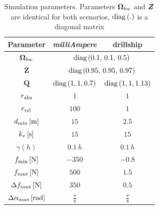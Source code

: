 \begin{table}[b]
    \centering
    \begin{tabular}{c|cc}
        {\bf Parameter} & {\bf \emph{milliAmpere}} & {\bf drillship} \\ \hline
        $\bm{\Omega}_{bw}$ & \multicolumn{2}{c}{$\operatorname*{diag}{(0.1,\,0.1,\,0.5)}$} \\
        $\mathbf{Z}$ & \multicolumn{2}{c}{$\operatorname*{diag}{(0.95,\,0.95,\,0.97)}$} \\
        $\mathbf{Q}$ & $\operatorname*{diag}{(1,1,0.7)}$ & $\operatorname*{diag}{(1,1,1.13)}$ \\
        $r_{\rm abs}$ & $1$ & $1$ \\
        $r_{\rm rel}$ & $100$ & $1$ \\
        $d_{\min} \, [{\rm m}]$ & $15$ & $2.5$ \\
        $k_v \, [{\rm s}]$ & $15$ & $15$ \\
        $\gamma(h)$ & $0.1\,h$ & $0.1\,h$ \\
        $f_{\min} \, [{\rm N}]$ & $-350$ & $-0.8$ \\
        $f_{\max} \, [{\rm N}]$ & $500$ & $1.5$ \\
        $\Delta f_{\max} \, [{\rm N}]$ & $350$ & $0.5$ \\
        $\Delta \alpha_{\max} \, [{\rm rad}]$ & $\frac{\pi}{8}$ & $\frac{\pi}{8}$
    \end{tabular}
    \caption{Simulation parameters. Parameters $\bm{\Omega}_{bw}$ and $\bm{Z}$ are identical for both scenarios, $\operatorname*{diag}{(.)}$ is a diagonal matrix}
    \label{tab:params}
\end{table}

